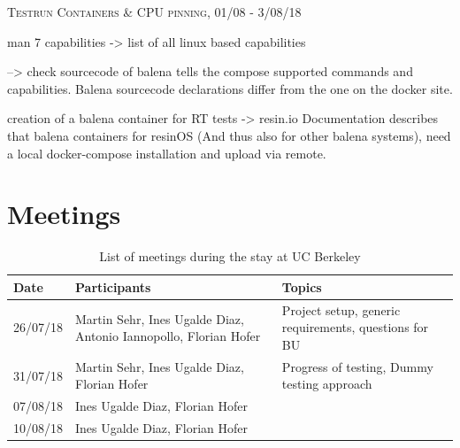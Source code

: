 \documentclass[]{scrartcl}
\begin{document}
{\small\textsc{Testrun Containers \& CPU pinning, 01/08 - 3/08/18} \bigskip}



man 7 capabilities  -> list of all linux based capabilities


--> check sourcecode of balena tells the compose supported commands and capabilities. Balena sourcecode declarations differ from the one on the docker site.

creation of a balena container for RT tests
-> resin.io
Documentation describes that balena containers for resinOS (And thus also for other balena systems), need a local docker-compose installation and upload via remote.


\section{Meetings}

\begin{table}[h]
	\centering
	\caption{List of meetings during the stay at UC Berkeley}
	
	\begin{tabular}{l p{5cm} p{5cm}}
	Date & Participants & Topics \\
	\hline
	26/07/18 & Martin Sehr, Ines Ugalde Diaz, Antonio Iannopollo, Florian Hofer & Project setup, generic requirements, questions for BU\\
	31/07/18 & Martin Sehr, Ines Ugalde Diaz, Florian Hofer & Progress of testing, Dummy testing approach\\
	07/08/18 & Ines Ugalde Diaz, Florian Hofer & \\
	10/08/18 & Ines Ugalde Diaz, Florian Hofer & \\
	\hline
	\end{tabular}
	
	\label{tab:meeting}
\end{table}
\end{document}

